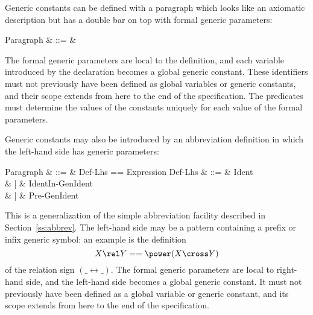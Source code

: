 Generic constants
can be defined with a paragraph which looks
like an axiomatic description but has a double bar on top with
formal generic parameters:
\begin{syntax}
    Paragraph & ::= & %
        \qquad {} \\
\end{syntax}
The formal generic parameters
are local to the definition, and each variable introduced by the
declaration becomes a global generic constant.
These identifiers must not previously have been defined as global
variables or generic constants, and their scope extends from here
to the end of the specification. The predicates
must determine the values of the constants
uniquely
for each value of the formal parameters.

Generic constants may also be introduced by an abbreviation
definition\symdex{$==$}
in which the left-hand side has generic parameters:
\begin{syntax}
        Paragraph & ::= & 
		Def-Lhs == Expression
\also
        Def-Lhs %
                & ::= & Ident\; \ropt \\
                &  |  & Ident\;In-Gen\;Ident \\
                &  |  & Pre-Gen\;Ident
\end{syntax}
This is a generalization of the simple abbreviation facility described
in Section~\ref{ss:abbrev}.
The left-hand side may be a pattern containing
a prefix or infix generic symbol:
an example is the definition
\[ X \rel Y == \power (X \cross Y) \]
of the relation sign $(\_ \rel \_)$.  The formal generic
parameters are local to right-hand side, and
the left-hand side becomes a global generic constant.  It must not
previously have been defined as a global variable or generic constant,
and its scope extends from here to the end of the specification.

